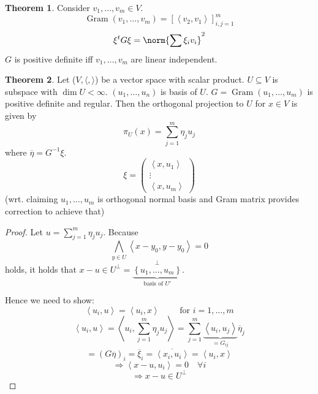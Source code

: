 \documentclass[a4paper,landscape,twocolumn]{article}
\newcommand\set[1]{\left\{#1\right\}}
\newcommand\functional[1]{\left\langle{#1}\right\rangle}
\theoremstyle{definition}
\newtheorem{theorem}{Theorem}
\DeclarePairedDelimiter\norm\lVert\rVert
\begin{document}
\begin{theorem}
  \label{satz-8.53}
  Consider $v_1, \ldots, v_m \in V$.
  \[ \operatorname{Gram}(v_1, \ldots, v_m) = \left[\functional{v_2, v_1}\right]^m_{i,j=1} \]
  \[ \xi^t G \xi = \norm{\sum \xi_i v_i}^2 \]
  $G$ is positive definite iff $v_1, \ldots, v_m$ are linear independent.
\end{theorem}

\begin{theorem}
  \label{satz-8.54}
  Let ($V, \langle, \rangle$) be a vector space with scalar product.
  $U \subseteq V$ is subspace with $\dim{U} < \infty$.
  $(u_1, \ldots, u_n)$ is basis of $U$.
  $G = \operatorname{Gram}(u_1, \ldots, u_m)$ is positive definite and regular.
  Then the orthogonal projection to $U$ for $x \in V$ is given by
  \[ \pi_U(x) = \sum_{j=1}^m \eta_j u_j \]
  where $\overline{\eta} = G^{-1} \xi$.
  \[ \xi = \begin{pmatrix} \functional{x,u_1} \\ \vdots \\ \functional{x,u_m} \end{pmatrix} \]
  (wrt. claiming $u_1, \ldots, u_m$ is orthogonal normal basis and Gram matrix provides correction to achieve that)
\end{theorem}
\begin{proof}
  Let $u = \sum_{j=1}^m \eta_j u_j$. Because
  \[ \bigwedge_{y \in U} \functional{x - y_0, y - y_0} = 0 \]
  holds, it holds that $x - u \in U^\bot = \underbrace{\set{u_1, \ldots, u_m}}_{\text{basis of } U'}^\bot$.

  Hence we need to show:
  \[ \functional{u_i, u} = \functional{u_i, x} \qquad \text{ for } i = 1, \ldots, m \]
  \[ \functional{u_i, u} = \functional{u_i, \sum_{j=1}^m \eta_j u_j} = \sum_{j=1}^m \underbrace{\functional{u_i, u_j}}_{= G_{ij}} \overline{\eta}_j \]
  \[ = (G \overline{\eta})_i = \overline{\xi}_i = \overline{\functional{x_i, u_i}} = \functional{u_i, x} \]
  \[ \Rightarrow \functional{x - u, u_i} = 0 \quad \forall i \]
  \[ \Rightarrow x-u \in U^\bot \]
\end{proof}
\end{document}

